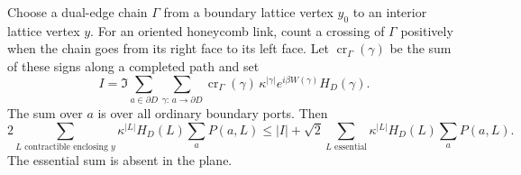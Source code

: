 \begin{auxlemma}
Choose a dual-edge chain $\Gamma$ from a boundary lattice vertex $y_0$ to an interior lattice vertex $y$. For an oriented honeycomb link, count a crossing of $\Gamma$ positively when the chain goes from its right face to its left face. Let $\operatorname{cr}_\Gamma(\gamma)$ be the sum of these signs along a completed path and set
\[
 I=\Im\sum_{a\in\partial D}\sum_{\gamma:\,a\to\partial D}
   \operatorname{cr}_\Gamma(\gamma)\,
   \kappa^{|\gamma|}e^{i\beta W(\gamma)}H_D(\gamma).
\]
The sum over $a$ is over all ordinary boundary ports. Then
\begin{equation}
 2\!\!\sum_{L\text{ contractible enclosing }y}
       \kappa^{|L|}H_D(L)\sum_aP(a,L)
 \le |I|+\sqrt2\!\sum_{L\text{ essential}}
       \kappa^{|L|}H_D(L)\sum_aP(a,L).
 \label{eq:legacy-P-G1}
\end{equation}
The essential sum is absent in the plane.
\end{auxlemma}
